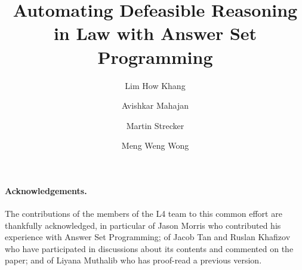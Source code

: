 \documentclass[runningheads]{llncs}
\begin{document}


\title{Automating Defeasible Reasoning in Law with Answer Set Programming}

\author{
Lim How Khang \and
Avishkar Mahajan \and
Martin Strecker \and
Meng Weng Wong
}


\maketitle

\begin{abstract}

\end{abstract}










%





\paragraph{Acknowledgements.}
The contributions of the members of the L4 team to this common effort are
thankfully acknowledged, in particular of Jason Morris who contributed his
experience with Answer Set Programming; of Jacob Tan and Ruslan Khafizov who
have participated in discussions about its contents and commented on the
paper; and of Liyana Muthalib who has proof-read a previous version.
\end{document}
